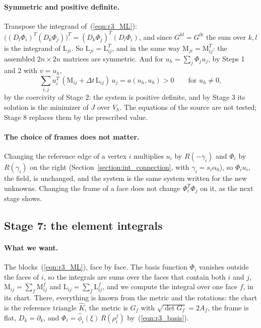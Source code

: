 \paragraph{Symmetric and positive definite.} Transpose the integrand of~(\ref{eqn:r3_ML}): $\big((D_l\Phi_i)^T(D_k\Phi_j)\big)^T = (D_k\Phi_j)^T(D_l\Phi_i)$, and since $G^{kl} = G^{lk}$ the sum over $k, l$ is the integrand of $\mathrm L_{ji}$. So $\mathrm L_{ji} = \mathrm L_{ij}^T$, and in the same way $\mathrm M_{ji} = \mathrm M_{ij}^T$: the assembled $2n\times 2n$ matrices are symmetric. And for $u_h = \sum_j\Phi_ju_j$, by Steps 1 and 2 with $v = u_h$,
\begin{equation*}
\sum_{i,j} u_i^T\, (\mathrm M_{ij} + \Delta t\,\mathrm L_{ij})\,u_j = a(u_h, u_h) > 0 \qquad \text{for } u_h \ne 0,
\end{equation*}
by the coercivity of Stage 2: the system is positive definite, and by Stage 3 its solution is the minimizer of $J$ over $V_h$. The equations of the source are not tested; Stage 8 replaces them by the prescribed value.

\paragraph{The choice of frames does not matter.} Changing the reference edge of a vertex $i$ multiplies $u_i$ by $R(-\gamma_i)$ and $\Phi_i$ by $R(\gamma_i)$ on the right (Section~\ref{section:int_connection}, with $\gamma_i = s_i\alpha_0$), so $\Phi_iu_i$, the field, is unchanged, and the system is the same system written for the new unknowns. Changing the frame of a face does not change $\Phi_i^T\Phi_j$ on it, as the next stage shows.

\subsection{Stage 7: the element integrals}
\label{section:r3_stage7}

\paragraph{What we want.} The blocks~(\ref{eqn:r3_ML}), face by face. The basis function $\Phi_i$ vanishes outside the faces of $i$, so the integrals are sums over the faces that contain both $i$ and $j$, $\mathrm M_{ij} = \sum_f \mathrm M^f_{ij}$ and $\mathrm L_{ij} = \sum_f \mathrm L^f_{ij}$, and we compute the integral over one face $f$, in its chart. There, everything is known from the metric and the rotations: the chart is the reference triangle $\hat K$, the metric is $G_f$ with $\sqrt{\det G_f} = 2A_f$, the frame is flat, $D_k = \partial_k$, and $\Phi_i = \hat\phi_i(\xi)\, R(\rho_i^f)$ by~(\ref{eqn:r3_basis}).

